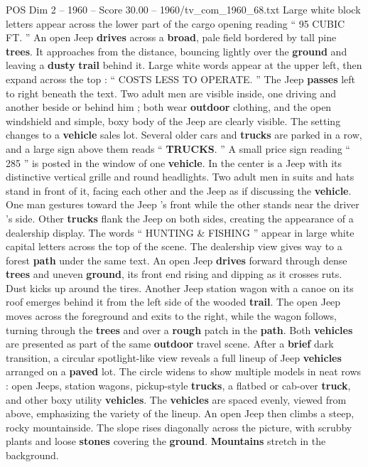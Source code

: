 \begin{textsample}{POS Dim 2 – 1960 – Score 30.00 – 1960/tv\_com\_1960\_68.txt}
Large white block letters appear across the lower part of the cargo opening reading “ 95 CUBIC FT. ” An open Jeep \textbf{drives} across a \textbf{broad}, pale field bordered by tall pine \textbf{trees}.
It approaches from the distance, bouncing lightly over the \textbf{ground} and leaving a \textbf{dusty} \textbf{trail} behind it.
Large white words appear at the upper left, then expand across the top : “ COSTS LESS TO OPERATE. ” The Jeep \textbf{passes} left to right beneath the text.
Two adult men are visible inside, one driving and another beside or behind him ; both wear \textbf{outdoor} clothing, and the open windshield and simple, boxy body of the Jeep are clearly visible.
The setting changes to a \textbf{vehicle} sales lot.
Several older cars and \textbf{trucks} are parked in a row, and a large sign above them reads “ \textbf{TRUCKS}. ” A small price sign reading “ 285 ” is posted in the window of one \textbf{vehicle}.
In the center is a Jeep with its distinctive vertical grille and round headlights.
Two adult men in suits and hats stand in front of it, facing each other and the Jeep as if discussing the \textbf{vehicle}.
One man gestures toward the Jeep ’s front while the other stands near the driver ’s side.
Other \textbf{trucks} flank the Jeep on both sides, creating the appearance of a dealership display.
The words “ HUNTING \& FISHING ” appear in large white capital letters across the top of the scene.
The dealership view gives way to a forest \textbf{path} under the same text.
An open Jeep \textbf{drives} forward through dense \textbf{trees} and uneven \textbf{ground}, its front end rising and dipping as it crosses ruts.
Dust kicks up around the tires.
Another Jeep station wagon with a canoe on its roof emerges behind it from the left side of the wooded \textbf{trail}.
The open Jeep moves across the foreground and exits to the right, while the wagon follows, turning through the \textbf{trees} and over a \textbf{rough} patch in the \textbf{path}.
Both \textbf{vehicles} are presented as part of the same \textbf{outdoor} travel scene.
After a \textbf{brief} dark transition, a circular spotlight-like view reveals a full lineup of Jeep \textbf{vehicles} arranged on a \textbf{paved} lot.
The circle widens to show multiple models in neat rows : open Jeeps, station wagons, pickup-style \textbf{trucks}, a flatbed or cab-over \textbf{truck}, and other boxy utility \textbf{vehicles}.
The \textbf{vehicles} are spaced evenly, viewed from above, emphasizing the variety of the lineup.
An open Jeep then climbs a steep, rocky mountainside.
The slope rises diagonally across the picture, with scrubby plants and loose \textbf{stones} covering the \textbf{ground}. \textbf{Mountains} stretch in the background.

\end{textsample}
